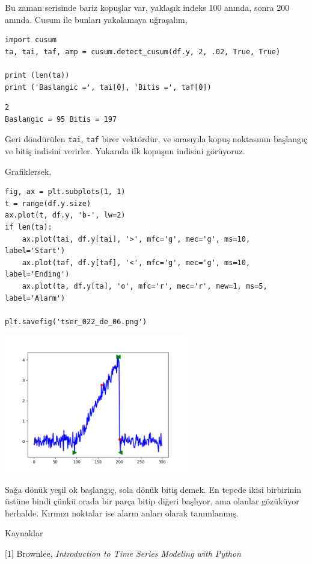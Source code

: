 \documentclass[12pt,fleqn]{article}\usepackage{../../common}
\begin{document}
Bu zaman serisinde bariz kopuşlar var, yaklaşık indeks 100 anında, sonra
200 anında. Cusum ile bunları yakalamaya uğraşalım,

\begin{verbatim}
import cusum
ta, tai, taf, amp = cusum.detect_cusum(df.y, 2, .02, True, True)

print (len(ta))
print ('Baslangic =', tai[0], 'Bitis =', taf[0])
\end{verbatim}

\begin{verbatim}
2
Baslangic = 95 Bitis = 197
\end{verbatim}

Geri döndürülen \verb!tai!, \verb!taf! birer vektördür, ve sırasıyıla kopuş
noktasının başlangıç ve bitiş indisini verirler. Yukarıda ilk kopuşun
indisini görüyoruz.

Grafiklersek,

\begin{verbatim}
fig, ax = plt.subplots(1, 1)
t = range(df.y.size)
ax.plot(t, df.y, 'b-', lw=2)
if len(ta):
    ax.plot(tai, df.y[tai], '>', mfc='g', mec='g', ms=10, label='Start')
    ax.plot(taf, df.y[taf], '<', mfc='g', mec='g', ms=10, label='Ending')
    ax.plot(ta, df.y[ta], 'o', mfc='r', mec='r', mew=1, ms=5, label='Alarm')
    
plt.savefig('tser_022_de_06.png')
\end{verbatim}

\includegraphics[height=6cm]{tser_022_de_06.png}

Sağa dönük yeşil ok başlangıç, sola dönük bitiş demek. En tepede ikisi
birbirinin üstüne bindi çünkü orada bir parça bitip diğeri başlıyor, ama olanlar
gözüküyor herhalde. Kırmızı noktalar ise alarm anları olarak tanımlanmış. 

Kaynaklar

[1] Brownlee, {\em Introduction to Time Series Modeling with Python}
\end{document}
